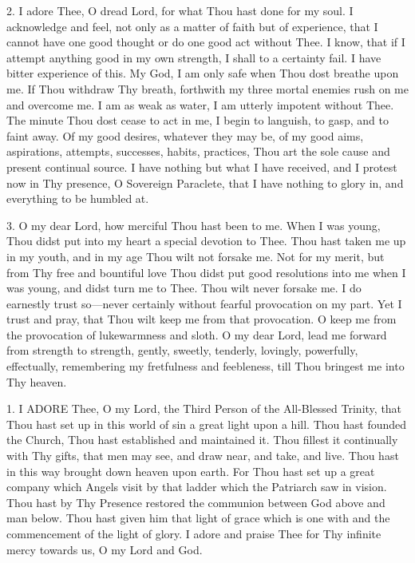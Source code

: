 2. I adore Thee, O dread Lord,
for what Thou hast done for my soul. I acknowledge and feel, not only as
a matter of faith but of experience, that I cannot have one good thought
or do one good act without Thee. I know, that if I attempt anything good
in my own strength, I shall to a certainty fail. I have bitter
experience of this. My God, I am only safe when Thou dost breathe upon
me. If Thou withdraw Thy breath, forthwith my three mortal enemies rush
on me and overcome me. I am as weak as water, I am utterly impotent
without Thee. The minute Thou dost cease to act in me, I begin to
languish, to gasp, and to faint away. Of my good desires, whatever they
may be, of my good aims, aspirations, attempts, successes, habits,
practices, Thou art the sole cause and present continual source. I have
nothing but what I have received, and I protest now in Thy presence, O
Sovereign Paraclete, that I have nothing to glory in, and
everything to be humbled at.

3. O my dear Lord, how merciful
Thou hast been to me. When I was young, Thou didst put into my heart a
special devotion to Thee. Thou hast taken me up in my youth, and in my
age Thou wilt not forsake me. Not for my merit, but from Thy free and
bountiful love Thou didst put good resolutions into me when I was young,
and didst turn me to Thee. Thou wilt never forsake me. I do earnestly
trust so—never certainly without fearful provocation on my part. Yet I
trust and pray, that Thou wilt keep me from that provocation. O keep me
from the provocation of lukewarmness and sloth. O my dear Lord, lead me
forward from strength to strength, gently, sweetly, tenderly, lovingly,
powerfully, effectually, remembering my fretfulness and feebleness, till
Thou bringest me into Thy heaven.


1. I ADORE
Thee, O my Lord, the Third Person of the All-Blessed Trinity, that Thou
hast set up in this world of sin a great light upon a hill. Thou hast
founded the Church, Thou hast established and maintained it. Thou
fillest it continually with Thy gifts, that men may see, and draw near,
and take, and live. Thou hast in this way brought down heaven upon
earth. For Thou hast set up a great company which Angels visit by that
ladder which the Patriarch saw in vision. Thou hast by Thy
Presence restored the communion between God above and man below. Thou
hast given him that light of grace which is one with and the
commencement of the light of glory. I adore and praise Thee for Thy
infinite mercy towards us, O my Lord and God.

